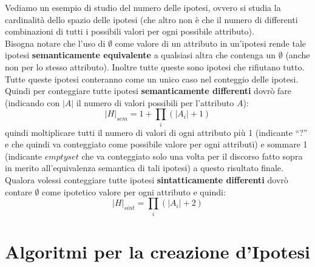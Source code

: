 \begin{esempio}
  Vediamo un esempio di studio del numero delle ipotesi, ovvero si studia la
  cardinalità dello spazio delle ipotesi (che altro non è che il numero di
  differenti combinazioni di tutti i possibili valori per ogni possibile
  attributo).\\
  Bisogna notare che l'uso di $\emptyset$ come valore di un attributo in
  un'ipotesi rende tale ipotesi \textbf{semanticamente equivalente} a qualsiasi
  altra che contenga un $\emptyset$ (anche non per lo stesso attributo). Inoltre
  tutte queste sono ipotesi che rifiutano tutto. Tutte queste ipotesi conteranno
  come un unico caso nel conteggio delle ipotesi.\\
  Quindi per conteggiare tutte ipotesi \textbf{semanticamente differenti} dovrò
  fare (indicando con $|A|$ il numero di valori possibili per l'attributo $A$):
  \[|H|_{sem}=1+\prod_{i}(|A_i|+1)\]
  quindi moltiplicare tutti il numero di valori di ogni attributo più 1
  (indicante ``?'' e che quindi va conteggiato come possibile valore per ogni
  attributi) e sommare 1 (indicante $emptyset$ che va conteggiato solo una volta
  per il discorso fatto sopra in merito all'equivalenza semantica di tali
  ipotesi) a questo risultato finale.\\
  Qualora volessi conteggiare tutte ipotesi \textbf{sintatticamente differenti}
  dovrò contare $\emptyset$ come ipotetico valore per ogni attributo e quindi:
  \[|H|_{sint}=\prod_{i} (|A_i|+2)\]
\end{esempio}
\newpage
\section{Algoritmi per la creazione d'Ipotesi}
